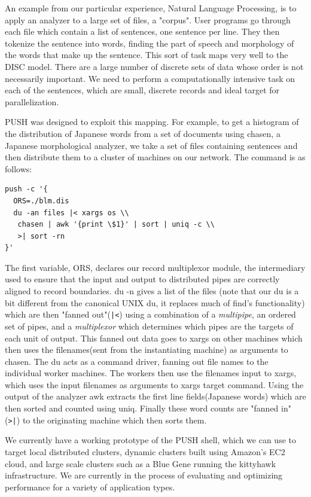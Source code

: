\documentclass{sig-alt-release2}
\begin{document}
An example from our particular experience, Natural Language Processing, is 
to apply an analyzer to a large set of files, a "corpus". User programs go 
through each file which contain a list of sentences, one sentence per line. 
They then tokenize the sentence into words, finding the part of speech and 
morphology of the words that make up the sentence.
This sort of task maps very well to the DISC model. There are a large number of 
discrete sets of data whose order is not necessarily important. We need to 
perform a computationally intensive task on each of the sentences, which are 
small, discrete records and ideal target for parallelization. 

PUSH was designed to exploit this mapping. For example, to get a histogram of 
the distribution of Japanese words from a set of documents using chasen, 
a Japanese morphological analyzer, we take a set of files containing sentences 
and then distribute them to a cluster of machines on our network. The command 
is as follows:

\begin{verbatim}
push -c '{
  ORS=./blm.dis
  du -an files |< xargs os \\
   chasen | awk '{print \$1}' | sort | uniq -c \\
   >| sort -rn
}'
\end{verbatim}

The first variable, ORS, declares our record multiplexor module, the intermediary 
used to ensure that the input and output to distributed pipes are correctly 
aligned to record boundaries. du -n gives a list of the files (note that our 
du is a bit different from the canonical UNIX du, it replaces much of find's 
functionality) which are then "fanned out"(\verb!|<!) using a combination 
of a \emph{multipipe}, an ordered set of pipes, and a \emph{multiplexor} 
which determines which pipes are the targets of each unit of output.  
This fanned out data goes to xargs on other machines which 
then uses the filenames(sent from the instantiating machine) as arguments to 
chasen. The du acts as a command driver, fanning out file names to the 
individual worker machines. The workers then use the filenames input to 
xargs, which uses the input filenames as arguments to xargs target command. 
Using the output of the analyzer awk extracts the first line fields(Japanese 
words) which are then sorted and counted using uniq.  Finally these word 
counts are "fanned in"(\verb!>|!) to the originating machine which then 
sorts them. 

We currently have a working prototype of the PUSH shell, which we can use
to target local distributed clusters, dynamic clusters built using Amazon's
EC2 cloud, and large scale clusters such as a Blue Gene 
running the kittyhawk infrastructure.  We are currently
in the process of evaluating and optimizing performance for a variety of 
application types.
\end{document}
